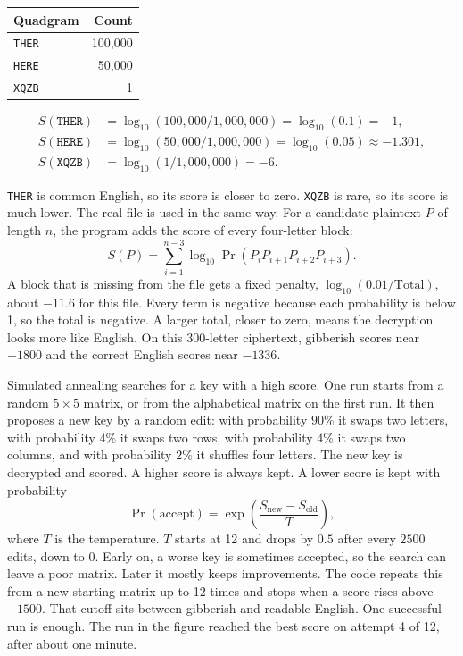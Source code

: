 \documentclass[12pt]{article}
\begin{document}
\begin{answer}
    \begin{center}
    \begin{tabular}{lr}
    \hline
    Quadgram & Count \\
    \hline
    \texttt{THER} & 100{,}000 \\
    \texttt{HERE} & 50{,}000 \\
    \texttt{XQZB} & 1 \\
    \hline
    \end{tabular}
    \end{center}

    \begin{align*}
    S(\texttt{THER})&=\log_{10}(100{,}000/1{,}000{,}000)=\log_{10}(0.1)=-1,\\
    S(\texttt{HERE})&=\log_{10}(50{,}000/1{,}000{,}000)=\log_{10}(0.05)\approx -1.301,\\
    S(\texttt{XQZB})&=\log_{10}(1/1{,}000{,}000)=-6.
    \end{align*}

    \texttt{THER} is common English, so its score is closer to zero. \texttt{XQZB} is rare, so its score is much lower. The real file is used in the same way. For a candidate plaintext \(P\) of length \(n\), the program adds the score of every four-letter block:
    \[
    S(P)=\sum_{i=1}^{n-3}\log_{10}\Pr(P_i P_{i+1} P_{i+2} P_{i+3}).
    \]
    A block that is missing from the file gets a fixed penalty, \(\log_{10}(0.01/\mathrm{Total})\), about \(-11.6\) for this file. Every term is negative because each probability is below 1, so the total is negative. A larger total, closer to zero, means the decryption looks more like English. On this 300-letter ciphertext, gibberish scores near \(-1800\) and the correct English scores near \(-1336\).

    Simulated annealing searches for a key with a high score. One run starts from a random \(5\times 5\) matrix, or from the alphabetical matrix on the first run. It then proposes a new key by a random edit: with probability \(90\%\) it swaps two letters, with probability \(4\%\) it swaps two rows, with probability \(4\%\) it swaps two columns, and with probability \(2\%\) it shuffles four letters. The new key is decrypted and scored. A higher score is always kept. A lower score is kept with probability
    \[
    \Pr(\text{accept})=\exp\!\left(\frac{S_{\mathrm{new}}-S_{\mathrm{old}}}{T}\right),
    \]
    where \(T\) is the temperature. \(T\) starts at 12 and drops by \(0.5\) after every \(2500\) edits, down to 0. Early on, a worse key is sometimes accepted, so the search can leave a poor matrix. Later it mostly keeps improvements. The code repeats this from a new starting matrix up to 12 times and stops when a score rises above \(-1500\). That cutoff sits between gibberish and readable English. One successful run is enough. The run in the figure reached the best score on attempt 4 of 12, after about one minute.


\end{answer}
\end{document}
